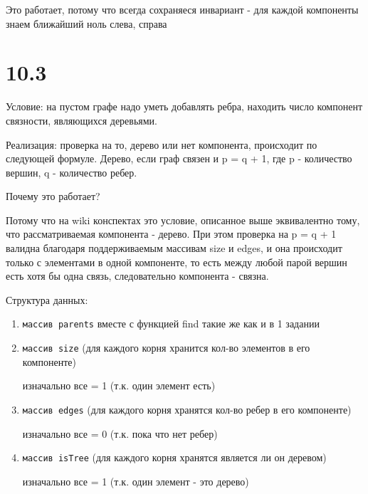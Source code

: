 \documentclass[12pt]{article}
\begin{document}
Это работает, потому что всегда сохраняеся инвариант - для каждой компоненты знаем ближайший ноль слева, справа

\section{10.3}
Условие: на пустом графе надо уметь добавлять ребра, находить число компонент связности, являющихся деревьями.

Реализация: проверка на то, дерево или нет компонента, происходит по следующей формуле. Дерево, если граф связен и p = q + 1, где p - количество вершин, q - количество ребер.

Почему это работает?

Потому что на wiki конспектах это условие, описанное выше эквивалентно тому, что рассматриваемая компонента - дерево. При этом проверка на p = q + 1 валидна благодаря поддерживаемым массивам size и edges, и она происходит только с элементами в одной компоненте, то есть между любой парой вершин есть хотя бы одна связь, следовательно компонента - связна.

Структура данных:
\begin{enumerate}
    \item \texttt{массив parents} 
    вместе с функцией find такие же как и в 1 задании
    \item \texttt{массив size} (для каждого корня хранится кол-во элементов в его компоненте)
    
    изначально все = 1 (т.к. один элемент есть)
    
    \item \texttt{массив edges} (для каждого корня хранятся кол-во ребер в его компоненте)
    
    изначально все = 0  (т.к. пока что нет ребер)
    
    \item \texttt{массив isTree} (для каждого корня хранятся является ли он деревом)
    
    изначально все = 1 (т.к. один элемент - это дерево)
\end{enumerate}
\end{document}
